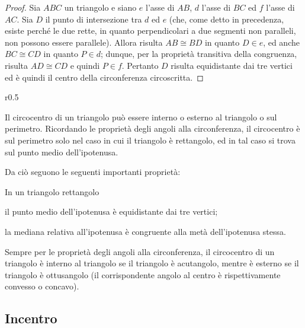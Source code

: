 \begin{inaccessibleblock}
 \begin{figure}[htb]
	\centering
\end{figure}
\end{inaccessibleblock}
\begin{proof}
Sia \(ABC\) un triangolo e siano \(e\) l'asse di \(AB\), \(d\) l'asse di \(BC\) 
ed \(f\) l'asse di \(AC\). Sia \(D\) il punto di intersezione tra \(d\) ed 
\(e\) (che, come detto in precedenza, esiste perché le due rette, in 
quanto perpendicolari a due segmenti non paralleli, non possono 
essere parallele). Allora risulta \(AB\cong BD\) in quanto \(D\in e\), ed 
anche \(BC\cong CD\) in quanto \(P\in d\); dunque, per la proprietà 
transitiva della congruenza, risulta \(AD\cong CD\) e quindi \(P\in f\). 
Pertanto \(D\) risulta equidistante dai tre vertici ed è quindi il 
centro della circonferenza circoscritta.
\end{proof}

\begin{wrapfigure}{r}{0.5\textwidth}
	\centering
\end{wrapfigure}
\osservazione Il circocentro di un triangolo può essere interno o 
esterno al triangolo o sul perimetro. Ricordando le proprietà degli 
angoli alla circonferenza, il circocentro è sul perimetro solo nel 
caso in cui il triangolo è rettangolo, ed in tal caso si trova sul 
punto medio dell'ipotenusa.

Da ciò seguono le seguenti importanti proprietà:
\begin{teorema}
In un triangolo rettangolo
\begin{itemize*}
\item il punto medio dell'ipotenusa è equidistante dai tre vertici;
\item la mediana relativa all'ipotenusa è congruente alla metà 
dell'ipotenusa stessa.
\end{itemize*}
\end{teorema}

Sempre per le proprietà degli angoli alla circonferenza, il 
circocentro di un triangolo è interno al triangolo se il triangolo è 
acutangolo, mentre è esterno se il triangolo è ottusangolo (il 
corrispondente angolo al centro è rispettivamente convesso o concavo).

\subsection{Incentro}

